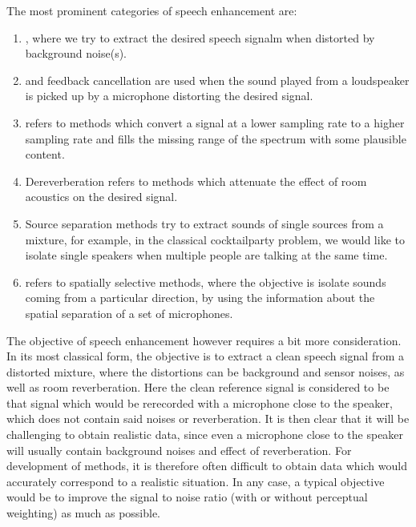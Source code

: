 \documentclass[letterpaper,10pt,english]{jupyterBook}
\begin{document}
\sphinxAtStartPar
The most prominent categories of speech enhancement are:
\begin{enumerate}
%
\item {} 
\sphinxAtStartPar
{\hyperref[\detokenize{Enhancement/Noise_attenuation::doc}]{}}, where we try to extract the
desired speech signalm when distorted by background noise(s).

\item {} 
\sphinxAtStartPar
{\hyperref[\detokenize{Enhancement/Echo_cancellation::doc}]{}} and feedback cancellation are
used when the sound played from a loudspeaker is picked up by a
microphone distorting the desired signal.

\item {} 
\sphinxAtStartPar
{\hyperref[\detokenize{Enhancement/Bandwidth_extension_BWE::doc}]{}} refers to methods
which convert a signal at a lower sampling rate to a higher sampling
rate and fills the missing range of the spectrum with some plausible
content.

\item {} 
\sphinxAtStartPar
Dereverberation refers to methods which attenuate the effect of room
acoustics on the desired signal.

\item {} 
\sphinxAtStartPar
Source separation methods try to extract sounds of single sources
from a mixture, for example, in the classical cocktail\sphinxhyphen{}party
problem, we would like to isolate single speakers when multiple
people are talking at the same time.

\item {} 
\sphinxAtStartPar
{\hyperref[\detokenize{Enhancement/Multi-channel_speech_enhancement_and_beamforming::doc}]{}}
refers to spatially selective methods, where the objective is
isolate sounds coming from a particular direction, by using the
information about the spatial separation of a set of microphones.

\end{enumerate}

\sphinxAtStartPar
The objective of speech enhancement however requires a bit more
consideration. In its most classical form, the objective is to extract a
clean speech signal from a distorted mixture, where the distortions can
be background and sensor noises, as well as room reverberation. Here the
clean reference signal is considered to be that signal which would be
rerecorded with a microphone close to the speaker, which does not
contain said noises or reverberation. It is then clear that it will be
challenging to obtain realistic data, since even a microphone close to
the speaker will usually contain background noises and effect of
reverberation. For development of methods, it is therefore often
difficult to obtain data which would accurately correspond to a
realistic situation. In any case, a typical objective would be to
improve the signal to noise ratio (with or without perceptual weighting)
as much as possible.
\end{document}
